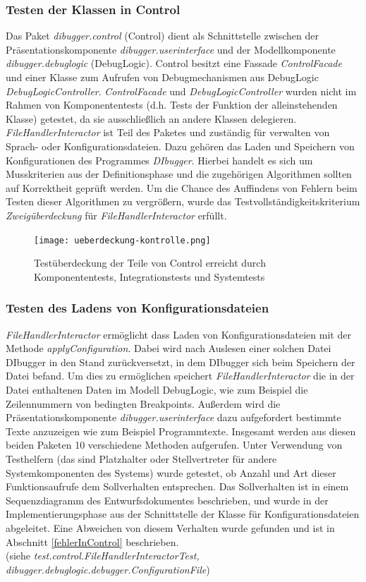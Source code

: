 \documentclass[parskip=full]{scrartcl}
\begin{document}
\subsubsection{Testen der Klassen in Control}
Das Paket \textit{dibugger.control} (Control) dient als Schnittstelle zwischen der Präsentationskomponente \textit{dibugger.userinterface} und der Modellkomponente \textit{dibugger.debuglogic} (DebugLogic).
Control besitzt eine Fassade \textit{ControlFacade} und einer Klasse zum Aufrufen von Debugmechanismen aus DebugLogic \textit{DebugLogicController}.
\textit{ControlFacade} und \textit{DebugLogicController} wurden nicht im Rahmen von Komponententests (d.h. Tests der Funktion der alleinstehenden Klasse) getestet, da sie ausschließlich an andere Klassen delegieren.\\
\textit{FileHandlerInteractor} ist Teil des Paketes und zuständig für verwalten von Sprach- oder Konfigurationsdateien.
Dazu gehören das Laden und Speichern von Konfigurationen des Programmes \textit{DIbugger}.
Hierbei handelt es sich um Musskriterien aus der Definitionsphase und die zugehörigen Algorithmen sollten auf Korrektheit geprüft werden.
Um die Chance des Auffindens von Fehlern beim Testen dieser Algorithmen zu vergrößern, wurde das Testvollständigkeitskriterium \textit{Zweigüberdeckung} für \textit{FileHandlerInteractor} erfüllt.

\begin{figure}[!h]
    \centering
    \texttt{[image: ueberdeckung-kontrolle.png]}
    \caption{Testüberdeckung der Teile von Control erreicht durch Komponententests, Integrationstests und Systemtests}\label{AbdeckungImInterpreter}
\end{figure}

\subsubsection{Testen des Ladens von Konfigurationsdateien}
\textit{FileHandlerInteractor} ermöglicht dass Laden von Konfigurationsdateien mit der Methode \textit{applyConfiguration}.
Dabei wird nach Auslesen einer solchen Datei DIbugger in den Stand zurückversetzt, in dem DIbugger sich beim Speichern der Datei befand.
Um dies zu ermöglichen speichert \textit{FileHandlerInteractor} die in der Datei enthaltenen Daten im Modell DebugLogic, wie zum Beispiel die Zeilennummern von bedingten Breakpoints.
Außerdem wird die Präsentationskomponente \textit{dibugger.userinterface} dazu aufgefordert bestimmte Texte anzuzeigen wie zum Beispiel Programmtexte.
Insgesamt werden aus diesen beiden Paketen 10 verschiedene Methoden aufgerufen.
Unter Verwendung von Testhelfern (das sind Platzhalter oder Stellvertreter für andere Systemkomponenten des Systems) wurde getestet, ob Anzahl und Art dieser Funktionsaufrufe dem Sollverhalten entsprechen.
Das Sollverhalten ist in einem Sequenzdiagramm des Entwurfsdokumentes beschrieben, und wurde in der Implementierungsphase aus der Schnittstelle der Klasse für Konfigurationsdateien abgeleitet.
Eine Abweichen von diesem Verhalten wurde gefunden und ist in Abschnitt \ref{fehlerInControl} beschrieben.\\
(siehe \textit{test.control.FileHandlerInteractorTest, dibugger.debuglogic.debugger.ConfigurationFile})
\end{document}
